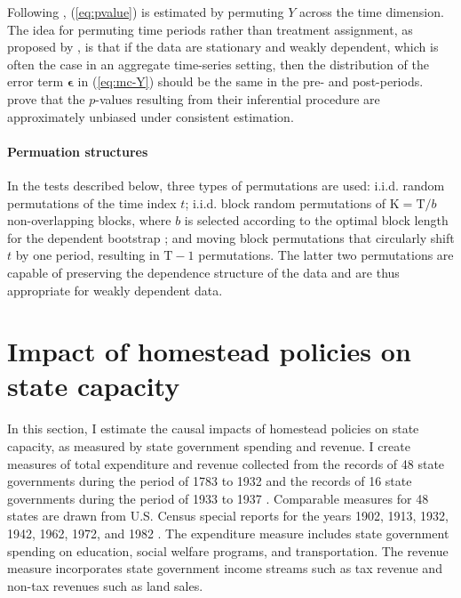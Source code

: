 Following \citet{chernozhukov2017exact}, (\ref{eq:pvalue}) is estimated by permuting $Y$ across the time dimension. The idea for permuting time periods rather than treatment assignment, as proposed by \citet{abadie2010synthetic}, is that if the data are stationary and weakly dependent, which is often the case in an aggregate time-series setting, then the distribution of the error term $\boldsymbol{\epsilon}$ in (\ref{eq:mc-Y}) should be the same in the pre- and post-periods. \citet{chernozhukov2017exact} prove that the $p$-values resulting from their inferential procedure are approximately unbiased under consistent estimation. 

\paragraph{Permuation structures} In the tests described below, three types of permutations are used: i.i.d. random permutations of the time index $t$; i.i.d. block random permutations of $\text{K}=\text{T}/b$ non-overlapping blocks, where $b$ is selected according to the optimal block length for the dependent bootstrap \citep{politis2004automatic}; and moving block permutations that circularly shift $t$ by one period, resulting in $\text{T}-1$ permutations. The latter two permutations are capable of preserving the dependence structure of the data and are thus appropriate for weakly dependent data. 

\section{Impact of homestead policies on state capacity} \label{state-capacity}

In this section, I estimate the causal impacts of homestead policies on state capacity, as measured by state government spending and revenue. I create measures of total expenditure and revenue collected from the records of 48 state governments during the period of 1783 to 1932 \citep{sylla1993sources} and the records of 16 state governments during the period of 1933 to 1937 \citep{sylla1995sourcesa,sylla1995sourcesb}. Comparable measures for 48 states are drawn from U.S. Census special reports for the years 1902, 1913, 1932, 1942, 1962, 1972, and 1982 \citep{haines2010}. The expenditure measure includes state government spending on education, social welfare programs, and transportation. The revenue measure incorporates state government income streams such as tax revenue and non-tax revenues such as land sales.

